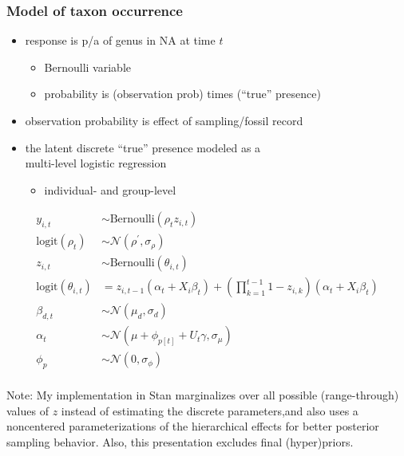 \documentclass{beamer}
\begin{document}
\begin{frame}
  \frametitle{Model of taxon occurrence}
  \begin{itemize}
    \item response is p/a of genus in NA at time \(t\)
      \begin{itemize}
        \item Bernoulli variable 
        \item probability is (observation prob) times (``true'' presence)
      \end{itemize}
    \item observation probability is effect of sampling/fossil record
    \item the latent discrete ``true'' presence modeled as a \\multi-level logistic regression
      \begin{itemize}
        \item individual- and group-level
      \end{itemize}
  \end{itemize}
\end{frame}

\begin{frame}
  \begin{align*}
    y_{i,t} &\sim \text{Bernoulli}(\rho_{t} z_{i,t}) \\
    \text{logit}(\rho_{t}) &\sim \mathcal{N}(\rho^{'}, \sigma_{\rho}) \\
    z_{i,t} &\sim \text{Bernoulli}(\theta_{i, t}) \\
    \text{logit}(\theta_{i, t}) &= z_{i,t-1} (\alpha_{t} + X_{i} \beta_{t}) + (\prod_{k = 1}^{t-1} 1 - z_{i,k}) (\alpha_{t} + X_{i} \beta_{t}) \\
    \beta_{d,t} &\sim \mathcal{N}(\mu_{d}, \sigma_{d}) \\
    \alpha_{t} &\sim \mathcal{N}(\mu + \phi_{p[t]} + U_{t} \gamma, \sigma_{\mu}) \\
    \phi_{p} &\sim \mathcal{N}(0, \sigma_{\phi}) \\
  \end{align*}

  \footnotesize{Note: My implementation in Stan marginalizes over all possible (range-through) values of \(z\) instead of estimating the discrete parameters,and also uses a noncentered parameterizations of the hierarchical effects for better posterior sampling behavior. Also, this presentation excludes final (hyper)priors.}
\end{frame}
\end{document}
